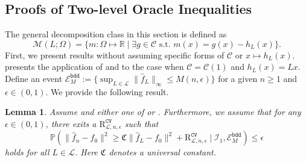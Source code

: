 \documentclass[12pt]{article}
\newtheorem{lemma}[theorem]{Lemma}
\begin{document}


\newpage
\begin{appendices}
\newpage
\section{Proofs of Two-level Oracle Inequalities}\label{app: two_level_oracle}

The general decomposition class in this section is defined as 
\begin{equation*}
    \mathcal{M}(L; \Omega) = \{m:\Omega \mapsto\mathbb{R} \mid \exists g \in \mathcal{C}\text{ s.t. } m(x)=g(x)-h_L(x)\}.
\end{equation*}
First, we present results without assuming specific forms of $\mathcal{C}$ or $x \mapsto h_L(x)$.  presents the application of  and  to the case when $\mathcal{C} = \mathcal{C}(1)$ and $h_L(x) = Lx$. Define an event $\mathcal{E}^{\mathtt{bdd}}_{M} := \{\sup_{L \in \mathcal{L}}\|\widehat{f}_L\|_\infty \le M(n, \epsilon)\}$ for a given $n \ge 1$ and $\epsilon \in (0,1)$. We provide the following result.
\begin{lemma}\label{lemma:general-tower-prop}
    Assume  and either one of  or . Furthermore, we assume that for any $\epsilon \in (0,1)$, there exits a $\mathrm{R}_{\mathcal{L}, n, \epsilon}^{\mathtt{CV}}$ such that
\begin{equation}\label{eq:oracle-CV}
    \mathbb{P}\left(\|\widehat{f}_n - f_0\|^2\ge \mathfrak{C}\|\widehat{f}_{L} - f_0\|^2 + \mathrm{R}_{\mathcal{L}, n, \epsilon}^{\mathtt{CV}} \mid\mathcal{I}_1, \mathcal{E}^{\mathtt{bdd}}_{M}\right) \le \epsilon
\end{equation}
holds for all $L \in \mathcal{L}$. Here $\mathfrak{C}$ denotes a universal constant.


\end{lemma}
\end{appendices}
\end{document}
